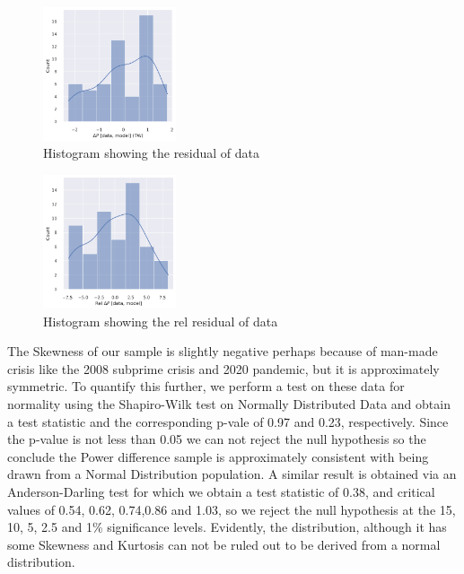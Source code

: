 \documentclass[final,5p,times,twocolumn,authoryear]{elsarticle}
\begin{document}
\begin{figure}
    \centering
    \includegraphics[width=0.35\textwidth]{figs/P_residual.png}
    \vspace*{-0.3cm}
    \caption{Histogram showing the residual of data}
    \label{fig:his_res}
\end{figure}

\begin{figure}
    \centering
    \includegraphics[width=0.35\textwidth]{figs/P_rel_residual.png}
    \vspace*{-0.3cm}
    \caption{Histogram showing the rel residual of data}
    \label{fig:his_rel_res}
\end{figure}


The Skewness of our sample is slightly negative perhaps because of man-made crisis like the 2008 subprime crisis and 2020 pandemic, but it is approximately symmetric. To quantify this further, we perform a test on these data for normality using the Shapiro-Wilk test on Normally Distributed Data and obtain a test statistic and the corresponding p-vale of 0.97 and 0.23, respectively. Since the p-value is not less than 0.05 we can not reject the null hypothesis so the conclude the Power difference sample is approximately consistent with being drawn from a Normal Distribution population. A similar result is obtained via an Anderson-Darling test for which we obtain a test statistic of 0.38, and critical values of 0.54, 0.62, 0.74,0.86 and 1.03, so we reject the null hypothesis at the 15, 10, 5, 2.5 and 1\% significance levels. Evidently, the distribution, although it has some Skewness and Kurtosis can not be ruled out to be derived from a normal distribution.
\end{document}

